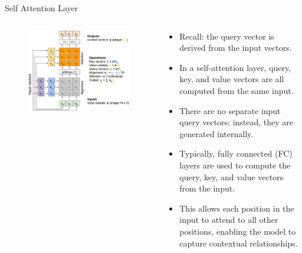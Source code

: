 \begin{frame}[allowframebreaks]{Self Attention Layer}
    \begin{columns}
    \begin{column}{0.6\textwidth}
        \begin{figure}
            \flushleft
            \includegraphics[width=\linewidth,height=\textheight,keepaspectratio]{images/transformers/slide_42_1_img.jpg}
        \end{figure}
    \end{column}
    \begin{column}{0.5\textwidth}
        \begin{itemize}
            \item Recall: the query vector is derived from the input vectors.
            \item In a self-attention layer, query, key, and value vectors are all computed from the same input.
            \item There are no separate input query vectors; instead, they are generated internally.
            \item Typically, fully connected (FC) layers are used to compute the query, key, and value vectors from the input.
            \item This allows each position in the input to attend to all other positions, enabling the model to capture contextual relationships.
        \end{itemize}
    \end{column}
    \end{columns}

    \framebreak


\end{frame}

